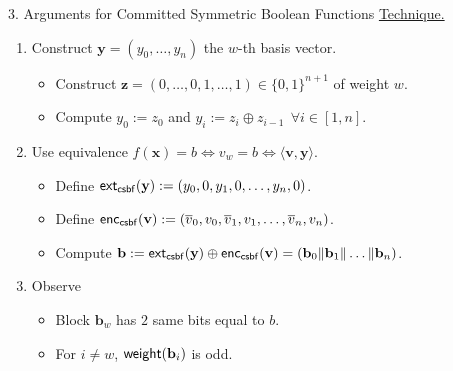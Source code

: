 \begin{frame}{3. Arguments for Committed Symmetric Boolean Functions}
	\underline{Technique.}
	\begin{enumerate}
		\item Construct $\mathbf{y} = (y_0, \dots, y_n)$ the $w$-th basis vector.
		\begin{itemize}
			\item Construct $\mathbf{z} = (0, \dots, 0, 1, \dots, 1) \in \{0,1\}^{n + 1}$ of weight $w$.
			\item Compute $y_0 := z_0$ and $y_i := z_i \oplus z_{i - 1}~~ \forall i \in [1, n]$. 
		\end{itemize}
		\item Use equivalence $f(\mathbf{x}) = b \iff v_w = b \iff \langle\mathbf{v}, \mathbf{y}\rangle$.
		\begin{itemize}
			\item Define $\mathsf{ext}_{\mathsf{csbf}}(\mathbf{y}) := (y_0, 0, y_1, 0, \dots, y_n, 0)$.
			\item Define $\mathsf{enc}_{\mathsf{csbf}}(\mathbf{v}) := (\overline{v}_0, v_0, \overline{v}_1, v_1, \dots, \overline{v}_n, v_n)$.
			\item Compute $\mathbf{b} := \mathsf{ext}_{\mathsf{csbf}}(\mathbf{y}) \oplus \mathsf{enc}_{\mathsf{csbf}}(\mathbf{v}) = (\mathbf{b}_0 \Vert \mathbf{b}_1\Vert \dots\Vert \mathbf{b}_n)$.
		\end{itemize}
		\item Observe
		\begin{itemize}
			\item Block $\mathbf{b}_w$ has $2$ same bits equal to $b$.
			\item For $i \neq w$, $\mathsf{weight}(\mathbf{b}_i)$ is odd.
		\end{itemize}
	\end{enumerate}
\end{frame}
